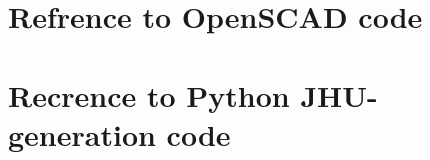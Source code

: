 \documentclass{report}
\begin{document}
\section{Refrence to OpenSCAD code}
\label{sec:openscad}



\section{Recrence to Python JHU-generation code}
\label{sec:jhu-gen}



\listoffigures

% 
\end{document}
